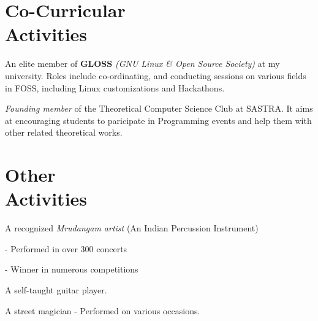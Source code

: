 \begin{resume}
		 \section{\sc Co-Curricular \\Activities}
			\begin{list2}
				\item An elite member of \textbf{\textsf{GLOSS}} \emph{(GNU Linux \& Open Source Society)} at my university. Roles include co-ordinating, and conducting sessions on various fields in FOSS, including Linux customizations and Hackathons.
				\medskip
				\item \emph{Founding member} of the Theoretical Computer Science Club at SASTRA. It aims at encouraging students to paricipate in Programming events and help them with other related theoretical works.
			\end{list2}
		
		\section{\sc Other \\Activities}
			\begin{list2}
				\item A recognized \emph{Mrudangam artist} (An Indian Percussion Instrument)
				\begin{list2}
					\item[-] Performed in over 300 concerts
					\item[-] Winner in numerous competitions
				\end{list2}
				\medskip
				\item A self-taught guitar player.
				\medskip
				\item A street magician - Performed on various occasions.
			\end{list2}
		

\end{resume}
